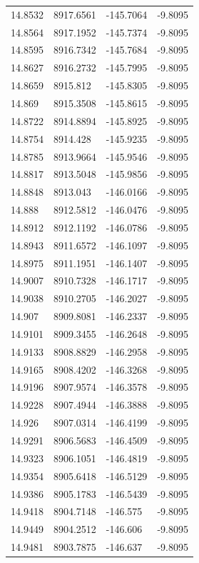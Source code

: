 \begin{table}[H]
\begin{tabular}{llll}
14.8532 & 8917.6561 & -145.7064 & -9.8095 \\
14.8564 & 8917.1952 & -145.7374 & -9.8095 \\
14.8595 & 8916.7342 & -145.7684 & -9.8095 \\
14.8627 & 8916.2732 & -145.7995 & -9.8095 \\
14.8659 & 8915.812 & -145.8305 & -9.8095 \\
14.869 & 8915.3508 & -145.8615 & -9.8095 \\
14.8722 & 8914.8894 & -145.8925 & -9.8095 \\
14.8754 & 8914.428 & -145.9235 & -9.8095 \\
14.8785 & 8913.9664 & -145.9546 & -9.8095 \\
14.8817 & 8913.5048 & -145.9856 & -9.8095 \\
14.8848 & 8913.043 & -146.0166 & -9.8095 \\
14.888 & 8912.5812 & -146.0476 & -9.8095 \\
14.8912 & 8912.1192 & -146.0786 & -9.8095 \\
14.8943 & 8911.6572 & -146.1097 & -9.8095 \\
14.8975 & 8911.1951 & -146.1407 & -9.8095 \\
14.9007 & 8910.7328 & -146.1717 & -9.8095 \\
14.9038 & 8910.2705 & -146.2027 & -9.8095 \\
14.907 & 8909.8081 & -146.2337 & -9.8095 \\
14.9101 & 8909.3455 & -146.2648 & -9.8095 \\
14.9133 & 8908.8829 & -146.2958 & -9.8095 \\
14.9165 & 8908.4202 & -146.3268 & -9.8095 \\
14.9196 & 8907.9574 & -146.3578 & -9.8095 \\
14.9228 & 8907.4944 & -146.3888 & -9.8095 \\
14.926 & 8907.0314 & -146.4199 & -9.8095 \\
14.9291 & 8906.5683 & -146.4509 & -9.8095 \\
14.9323 & 8906.1051 & -146.4819 & -9.8095 \\
14.9354 & 8905.6418 & -146.5129 & -9.8095 \\
14.9386 & 8905.1783 & -146.5439 & -9.8095 \\
14.9418 & 8904.7148 & -146.575 & -9.8095 \\
14.9449 & 8904.2512 & -146.606 & -9.8095 \\
14.9481 & 8903.7875 & -146.637 & -9.8095 \\

\end{tabular}
\end{table}
